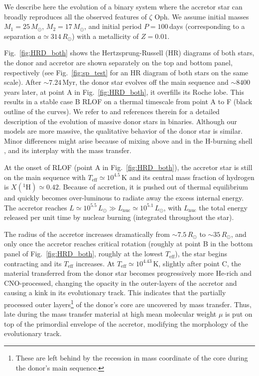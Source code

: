\documentclass[twocolumn,twocolappendix,trackchanges]{aastex63}
\DeclareRobustCommand{\Figref}[1]{Fig.~\ref{#1}}
\newcommand{\zoph}{$\zeta$ Oph}
\begin{document}
We describe here the evolution of a binary system where the accretor
star can broadly reproduces all the observed features of \zoph. We
assume initial masses $M_1=25\,M_\odot$, $M_2=17\,M_\odot$, and initial
period $P=100$\,days (corresponding to a separation
$a\simeq314\,R_\odot$) with a metallicity of $Z=0.01$.

\Figref{fig:HRD_both} shows the Hertzsprung-Russell (HR) diagrams of
both stars, the donor and accretor are shown separately on the top and
bottom panel, respectively (see \Figref{fig:sp_test} for an HR diagram of both stars on the same scale). After $\sim$$7.24$\,Myr, the donor star evolves off the main sequence and
$\sim8400$\,years later, at point A in \Figref{fig:HRD_both}, it overfills its Roche lobe. This results in a stable case B RLOF on a thermal timescale from point A to F (black outline of the curves). We refer to \cite{gotberg:17, klencki:20, laplace:21, blagorodnova:21} and references therein for a detailed description of the evolution of massive donor stars in binaries. Although our models are more massive, the qualitative behavior of the donor star is similar. Minor differences might arise because of mixing above and in the H-burning shell \citep[e.g.,][]{schootemeijer:19, klencki:21}, and its interplay with the mass transfer.

At the onset of RLOF (point A in \Figref{fig:HRD_both}), the accretor star is still on the main sequence with
$T_\mathrm{eff}\simeq10^{4.5}$\,K and its central mass fraction of hydrogen is $X(^1\mathrm{H})\simeq
0.42$. Because of accretion, it is pushed out of thermal equilibrium and quickly becomes over-luminous to radiate away the excess internal energy. The accretor reaches $L\simeq10^{5.5}\,L_\odot\gg
L_\mathrm{nuc}\simeq
10^{5.1}\,L_\odot$, with
$L_\mathrm{nuc}$ the total energy released per unit time by nuclear burning (integrated throughout the star).

The radius of the accretor increases dramatically from
$\sim7.5\,R_\odot$ to $\sim35\,R_\odot$, and only once the accretor
reaches critical rotation (roughly at point B in the bottom panel of
\Figref{fig:HRD_both}, roughly at the lowest $T_\mathrm{eff}$), the
star begins contracting and its $T_\mathrm{eff}$ increases. At
$T_\mathrm{eff}\simeq 10^{4.43}$\,K, slightly after point C, the
material transferred from the donor star becomes progressively more
He-rich and CNO-processed, changing the opacity in the outer-layers of
the accretor and causing a kink in its evolutionary track. This
indicates that the partially processed outer layers\footnote{These are
  left behind by the recession in mass coordinate of the core during
  the donor's main sequence.} of the donor's core are uncovered by
mass transfer.
Thus, late during the mass transfer material at high mean molecular
weight $\mu$ is put on top of the primordial envelope of the accretor,
modifying the morphology of the evolutionary track.
\end{document}
